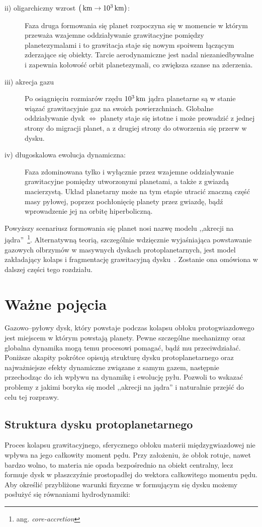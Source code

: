 \begin{description}
\item[ii) oligarchiczny wzrost $\left(\hbox{$\thinspace\textrm{km}$} \rightarrow
   10^3\hbox{$\thinspace\textrm{km}$}\right)$:]
   Faza druga formowania się planet rozpoczyna się w momencie w którym przeważa
   wzajemne oddziaływanie grawitacyjne pomiędzy planetezymalami i to grawitacja
   staje się nowym spoiwem łączącym zderzające się obiekty. Tarcie
   aerodynamiczne jest nadal niezaniedbywalne i zapewnia kołowość orbit
   planetezymali, co zwiększa szanse na zderzenia.
\item[iii) akrecja gazu]
   Po osiągnięciu rozmiarów rzędu $10^3\hbox{$\thinspace\textrm{km}$}$ jądra planetarne
   są w stanie wiązać grawitacyjnie gaz na swoich powierzchniach. Globalne
   oddziaływanie dysk $\iff$ planety staje się istotne i może prowadzić z jednej
   strony do migracji planet, a z drugiej strony do otworzenia się przerw w
   dysku.
\item[iv) długoskalowa ewolucja dynamiczna:]
   Faza zdominowana tylko i wyłącznie przez wzajemne oddziaływanie grawitacyjne
   pomiędzy utworzonymi planetami, a także z gwiazdą macierzystą. Układ
   planetarny może na tym etapie utracić znaczną część masy pyłowej, poprzez
   pochłonięcię planety przez gwiazdę, bądź wprowadzenie jej na orbitę
   hiperboliczną.
\end{description}
Powyższy scenariusz formowania się planet nosi nazwę modelu ,,akrecji na
jądra''~\footnote{ang. \emph{core-accretion}}. Alternatywną teorią, szczególnie
wdzięcznie wyjaśniająca powstawanie gazowych olbrzymów w masywnych dyskach
protoplanetarnych, jest model zakładający kolaps i fragmentację grawitacyjną
dysku~\cite{Boss}. Zostanie ona omówiona w dalszej części tego rozdziału.

\section{Ważne pojęcia}
Gazowo--pyłowy dysk, który powstaje podczas kolapsu obłoku protogwiazdowego jest
miejscem w którym powstają planety. Pewne szczególne mechanizmy oraz globalna
dynamika mogą temu procesowi pomagać, bądź mu przeciwdziałać. Poniższe akapity
pokrótce opisują strukturę dysku protoplanetarnego oraz najważniejsze efekty
dynamiczne związane z samym gazem, następnie przechodząc do ich wpływu na
dynamikę i ewolucję pyłu. Pozwoli to wskazać problemy z jakimi boryka się model
,,akrecji na jądra'' i naturalnie przejść do celu tej rozprawy.

\subsection{Struktura dysku protoplanetarnego}
Proces kolapsu grawitacyjnego, sferycznego obłoku materii międzygwiazdowej nie
wpływa na jego całkowity moment pędu. Przy założeniu, że obłok rotuje, nawet
bardzo wolno, to materia nie opada bezpośrednio na obiekt
centralny, lecz formuje dysk w płaszczyźnie prostopadłej do wektora całkowitego
momentu pędu. Aby określić przybliżone warunki fizyczne w formującym się dysku
możemy posłużyć się równaniami hydrodynamiki:

